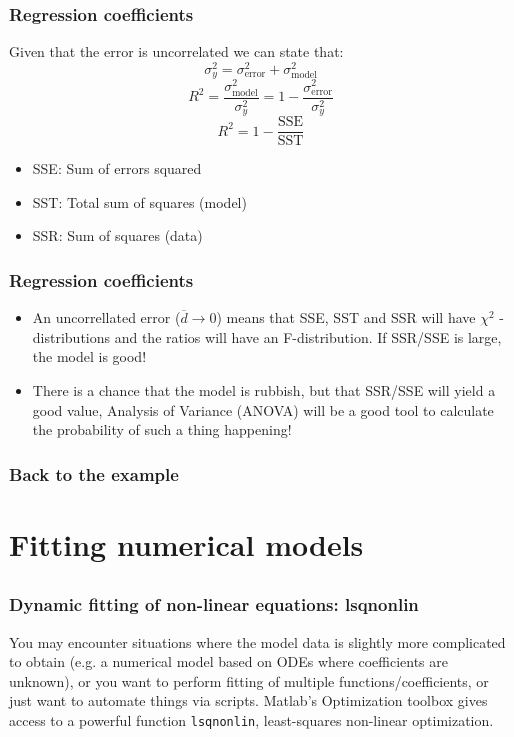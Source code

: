 \documentclass[11pt,table,final,fleqn,xcolor={usenames,dvipsnames,table}]{beamer}
\begin{document}
\begin{frame}[fragile] 
  \frametitle{Regression coefficients}
  Given that the error is uncorrelated we can state that:
    \[
      \sigma^2_y = \sigma^2_\text{error}+\sigma^2_\text{model}
    \]
    \[
      R^2 = \frac{\sigma^2_\text{model}}{\sigma^2_y} = 1 - \frac{\sigma^2_\text{error}}{\sigma^2_y}
    \]
    \[
      R^2 = 1 - \frac{\text{SSE}}{\text{SST}}
    \]
    \begin{itemize}
      \item SSE: Sum of errors squared
      \item SST: Total sum of squares (model)
      \item SSR: Sum of squares (data)
   \end{itemize}
\end{frame}

\begin{frame}[fragile] 
  \frametitle{Regression coefficients}
    \begin{itemize}
      \item An uncorrellated error ($\overline{d} \rightarrow 0$) means that SSE, SST and SSR will have $\chi^2$ -distributions and the ratios will have an F-distribution. If SSR/SSE is large, the model is good!
      \item There is a chance that the model is rubbish, but that SSR/SSE will yield a good value, Analysis of Variance (ANOVA) will be a good tool to calculate the probability of such a thing happening!
   \end{itemize}
\end{frame}

\begin{frame}[fragile] 
  \frametitle{Back to the example}
\end{frame}

\section{Fitting numerical models}
\subsection*{}
\begin{frame}[fragile] 
  \frametitle{Dynamic fitting of non-linear equations: lsqnonlin}
  You may encounter situations where the model data is slightly more complicated to obtain (e.g. a numerical model based on ODEs where coefficients are unknown), or you want to perform fitting of multiple functions/coefficients, or just want to automate things via scripts. Matlab's Optimization toolbox gives access to a powerful function \lstinline$lsqnonlin$, least-squares non-linear optimization.
\end{frame}
  
\end{document}
